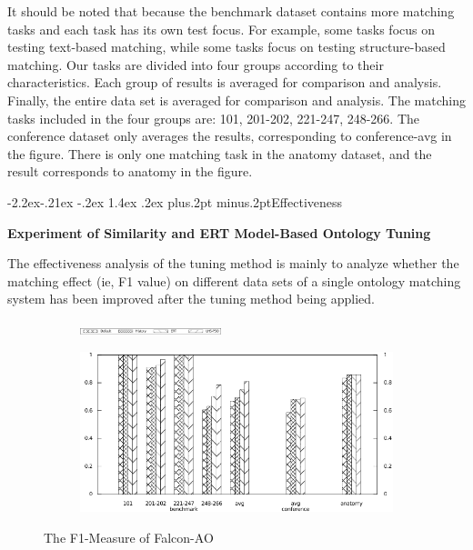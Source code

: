 \documentclass[twoside]{article}
\makeatletter
\def\subsubsection{\@startsection{subsubsection}{3}{\z@}%
 {-2.2ex\@plus -.21ex \@minus -.2ex}%
 {1.4ex \@plus.2ex}
{\normalfont\normalsize\protect\baselineskip=12pt plus.2pt minus.2pt\sl}}
\makeatother
\begin{document}
It should be noted that because the benchmark dataset contains more matching tasks and each task has its own test focus.
For example, some tasks focus on testing text-based matching, while some tasks focus on testing structure-based matching.
Our tasks are divided into four groups according to their characteristics.
Each group of results is averaged for comparison and analysis.
Finally, the entire data set is averaged for comparison and analysis.
The matching tasks included in the four groups are: 101, 201-202, 221-247, 248-266.
The conference dataset only averages the results, corresponding to conference-avg in the figure.
There is only one matching task in the anatomy dataset, and the result corresponds to anatomy in the figure.


\subsubsection{Effectiveness}

{\bf Experiment of Similarity and ERT Model-Based Ontology Tuning}

The effectiveness analysis of the tuning method is mainly to analyze whether the matching effect (ie, F1 value) on different data sets of a single ontology matching system has been improved after the tuning method being applied.

\begin{figure}[htb!]
\centering
\begin{subfigure}{\textwidth}
\centering
\includegraphics[width=0.45\textwidth]{figures/legend.pdf}
\end{subfigure}

\begin{subfigure}{0.5\textwidth}
	\centering
	\includegraphics[width=\textwidth]{data_figs/Falcon-AO_F1-Measure.pdf}
\end{subfigure}
\caption{The F1-Measure of Falcon-AO}
\label{fig:Falcon-AO_F1-Measure}
\end{figure}
\end{document}

